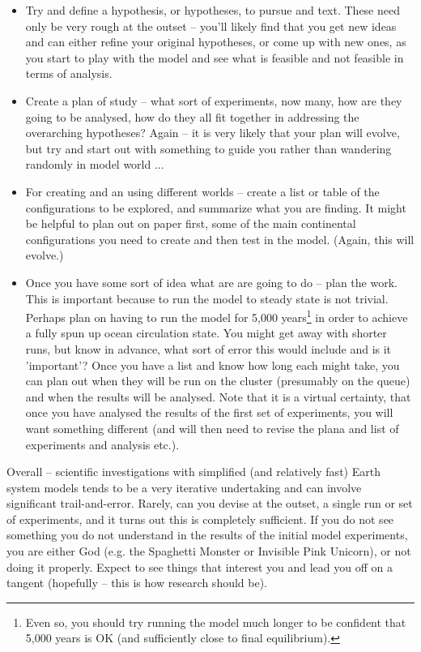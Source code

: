 \documentclass[11pt,fleqn]{book} %
\begin{document}
\begin{itemize}[noitemsep]
\item Try and define a hypothesis, or hypotheses, to pursue and text. These need only be very rough at the outset -- you'll likely find that you get new ideas and can either refine your original hypotheses, or come up with new ones, as you start to play with the model and see what is feasible and not feasible in terms of analysis.
\item Create a plan of study -- what sort of experiments, now many, how are they going to be analysed, how do they all fit together in addressing the overarching hypotheses? Again -- it is very likely that your plan will evolve, but try and start out with something to guide you rather than wandering randomly in model world ...
\item For creating and an using different worlds -- create a list or table of the configurations to be explored, and summarize what you are finding. It might be helpful to plan out on paper first, some of the main continental configurations you need to create and then test in the model. (Again, this will evolve.)
\item Once you have some sort of idea what are are going to do -- plan the work. This is important because to run the model to steady state is not trivial. Perhaps plan on having to run the model for 5,000 years\footnote{Even so, you should try running the model much longer to be confident that 5,000 years is OK (and sufficiently close to final equilibrium).} in order to achieve a fully spun up ocean circulation state. You might get away with shorter runs, but know in advance, what sort of error this would include and is it 'important'? Once you have a list and know how long each might take, you can plan out when they will be run on the cluster (presumably on the queue) and when the results will be analysed. Note that it is a virtual certainty, that once you have analysed the results of the first set of experiments, you will want something different (and will then need to revise the plana and list of experiments and analysis etc.).
\end{itemize}

\noindent Overall -- scientific investigations with simplified (and relatively fast) Earth system models tends to be a very iterative undertaking and can involve significant trail-and-error. Rarely, can you devise at the outset, a single run or set of experiments, and it turns out this is completely sufficient. If you do not see something you do not understand in the results of the initial model experiments, you are either God (e.g. the Spaghetti Monster or Invisible Pink Unicorn), or not doing it properly. Expect to see things that interest you and lead you off on a tangent (hopefully -- this is how research should be).
\end{document}
